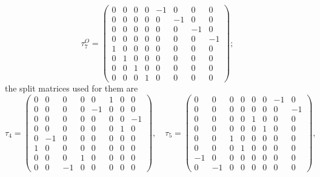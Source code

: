 \documentclass[10pt,a4paper]{article}
\begin{document}
\begin{equation*}
\tau^{O}_7=\begin{pmatrix}0 & 0 & 0 & 0 & -1 & 0 & 0 & 0 \\ 0 & 0 & 0 & 0 & 0 & -1 & 0 & 0 \\ 0 & 0 & 0 & 0 & 0 & 0 & -1 & 0 \\ 0 & 0 & 0 & 0 & 0 & 0 & 0 & -1 \\ 1 & 0 & 0 & 0 & 0 & 0 & 0 & 0 \\ 0 & 1 & 0 & 0 & 0 & 0 & 0 & 0 \\ 0 & 0 & 1 & 0 & 0 & 0 & 0 & 0 \\ 0 & 0 & 0 & 1 & 0 & 0 & 0 & 0\end{pmatrix};
\end{equation*}
the split matrices used for them are
\begin{equation*}
\tau_4=\begin{pmatrix}0 & 0 & 0 & 0 & 0 & 1 & 0 & 0 \\ 0 & 0 & 0 & 0 & -1 & 0 & 0 & 0 \\ 0 & 0 & 0 & 0 & 0 & 0 & 0 & -1 \\ 0 & 0 & 0 & 0 & 0 & 0 & 1 & 0 \\ 0 & -1 & 0 & 0 & 0 & 0 & 0 & 0 \\ 1 & 0 & 0 & 0 & 0 & 0 & 0 & 0 \\ 0 & 0 & 0 & 1 & 0 & 0 & 0 & 0 \\ 0 & 0 & -1 & 0 & 0 & 0 & 0 & 0\end{pmatrix},\quad \tau_5=\begin{pmatrix}0 & 0 & 0 & 0 & 0 & 0 & -1 & 0 \\ 0 & 0 & 0 & 0 & 0 & 0 & 0 & -1 \\ 0 & 0 & 0 & 0 & 1 & 0 & 0 & 0 \\ 0 & 0 & 0 & 0 & 0 & 1 & 0 & 0 \\ 0 & 0 & 1 & 0 & 0 & 0 & 0 & 0 \\ 0 & 0 & 0 & 1 & 0 & 0 & 0 & 0 \\ -1 & 0 & 0 & 0 & 0 & 0 & 0 & 0 \\ 0 & -1 & 0 & 0 & 0 & 0 & 0 & 0\end{pmatrix},
\end{equation*}
\end{document}
